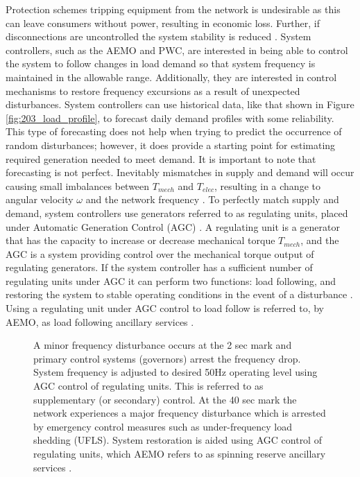 Protection schemes tripping equipment from the network is undesirable as this can leave consumers without power, resulting in economic loss. Further, if disconnections are uncontrolled the system stability is reduced \cite{AEMOpowerfreqriskrev}. System controllers, such as the AEMO and PWC, are interested in being able to control the system to follow changes in load demand so that system frequency is maintained in the allowable range. Additionally, they are interested in control mechanisms to restore frequency excursions as a result of unexpected disturbances. System controllers can use historical data, like that shown in Figure \ref{fig:203_load_profile}, to forecast daily demand profiles with some reliability. This type of forecasting does not help when trying to predict the occurrence of random disturbances; however, it does provide a starting point for estimating required generation needed to meet demand. It is important to note that forecasting is not perfect. Inevitably mismatches in supply and demand will occur causing small imbalances between $T_{mech}$ and $T_{elec}$, resulting in a change to angular velocity $\omega$ and the network frequency \cite{Glover2012}. To perfectly match supply and demand, system controllers use generators referred to as regulating units, placed under Automatic Generation Control (AGC) \cite{Kothari2011}. A regulating unit is a generator that has the capacity to increase or decrease mechanical torque $T_{mech}$, and the AGC is a system providing control over the mechanical torque output of regulating generators. If the system controller has a sufficient number of regulating units under AGC it can perform two functions: load following, and restoring the system to stable operating conditions in the event of a disturbance \cite{Grainger1994}. Using a regulating unit under AGC control to load follow is referred to, by AEMO, as load following ancillary services \cite{AEMOancilliaryserv}.

\begin{figure}[ht]
	\centering
	
	\caption[Frequency profiles of differing disturbance types]{A minor frequency disturbance occurs at the 2 sec mark and primary control systems (governors) arrest the frequency drop. System frequency is adjusted to desired 50$\si{\hertz}$ operating level using AGC control of regulating units. This is referred to as supplementary (or secondary) control. At the 40 sec mark the network experiences a major frequency disturbance which is arrested by emergency control measures such as under-frequency load shedding (UFLS). System restoration is aided using AGC control of regulating units, which AEMO refers to as spinning reserve ancillary services \cite{Bevrani2011}.}
	\label{fig:204_frequency_arrest}
\end{figure}

